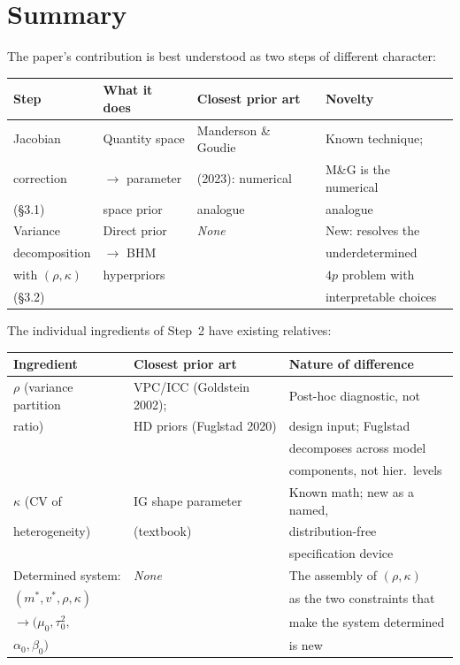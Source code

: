 \documentclass[12pt,a4paper]{article}
\begin{document}
\section{Summary}

The paper's contribution is best understood as two steps of different character:

\begin{center}
\begin{tabular}{llll}
\toprule
\textbf{Step} & \textbf{What it does} & \textbf{Closest prior art} & \textbf{Novelty} \\
\midrule
Jacobian & Quantity space & Manderson \& Goudie & Known technique; \\
correction & $\to$ parameter & (2023): numerical & M\&G is the numerical \\
(\S3.1) & space prior & analogue & analogue \\
\addlinespace
Variance & Direct prior & \emph{None} & New: resolves the \\
decomposition & $\to$ BHM & & underdetermined \\
with $(\rho, \kappa)$ & hyperpriors & & $4p$ problem with \\
(\S3.2) & & & interpretable choices \\
\bottomrule
\end{tabular}
\end{center}

\noindent The individual ingredients of Step~2 have existing relatives:

\begin{center}
\begin{tabular}{lll}
\toprule
\textbf{Ingredient} & \textbf{Closest prior art} & \textbf{Nature of difference} \\
\midrule
$\rho$ (variance partition & VPC/ICC (Goldstein 2002); & Post-hoc diagnostic, not \\
\quad ratio) & HD priors (Fuglstad 2020) & design input; Fuglstad \\
 & & decomposes across model \\
 & & components, not hier.\ levels \\
\addlinespace
$\kappa$ (CV of & IG shape parameter & Known math; new as a named, \\
\quad heterogeneity) & (textbook) & distribution-free \\
 & & specification device \\
\addlinespace
Determined system: & \emph{None} & The assembly of $(\rho, \kappa)$ \\
$(m^*, v^*, \rho, \kappa)$ & & as the two constraints that \\
$\to (\mu_0, \tau_0^2,$ & & make the system determined \\
$\alpha_0, \beta_0)$ & & is new \\
\bottomrule
\end{tabular}
\end{center}
\end{document}
